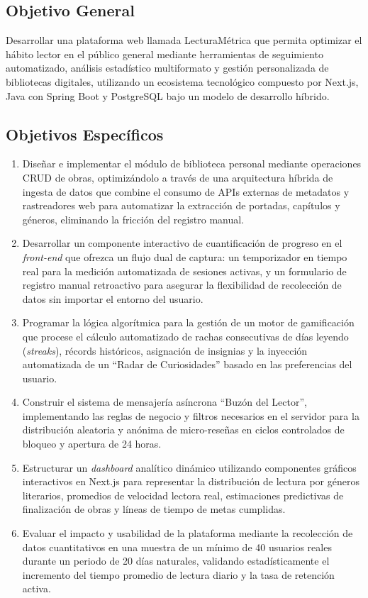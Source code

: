 \documentclass[12pt, atypical, journal]{article}
\begin{document}
\subsection{Objetivo General}
Desarrollar una plataforma web llamada LecturaMétrica que permita optimizar el hábito lector en el público general mediante herramientas de seguimiento automatizado, análisis estadístico multiformato y gestión personalizada de bibliotecas digitales, utilizando un ecosistema tecnológico compuesto por Next.js, Java con Spring Boot y PostgreSQL bajo un modelo de desarrollo híbrido.

\subsection{Objetivos Específicos}
\begin{enumerate}
   \item Diseñar e implementar el módulo de biblioteca personal mediante operaciones CRUD de obras, optimizándolo a través de una arquitectura híbrida de ingesta de datos que combine el consumo de APIs externas de metadatos y rastreadores web para automatizar la extracción de portadas, capítulos y géneros, eliminando la fricción del registro manual.
   \item Desarrollar un componente interactivo de cuantificación de progreso en el \textit{front-end} que ofrezca un flujo dual de captura: un temporizador en tiempo real para la medición automatizada de sesiones activas, y un formulario de registro manual retroactivo para asegurar la flexibilidad de recolección de datos sin importar el entorno del usuario.
   \item Programar la lógica algorítmica para la gestión de un motor de gamificación que procese el cálculo automatizado de rachas consecutivas de días leyendo (\textit{streaks}), récords históricos, asignación de insignias y la inyección automatizada de un ``Radar de Curiosidades'' basado en las preferencias del usuario.
   \item Construir el sistema de mensajería asíncrona ``Buzón del Lector'', implementando las reglas de negocio y filtros necesarios en el servidor para la distribución aleatoria y anónima de micro-reseñas en ciclos controlados de bloqueo y apertura de 24 horas.
   \item Estructurar un \textit{dashboard} analítico dinámico utilizando componentes gráficos interactivos en Next.js para representar la distribución de lectura por géneros literarios, promedios de velocidad lectora real, estimaciones predictivas de finalización de obras y líneas de tiempo de metas cumplidas.
   \item Evaluar el impacto y usabilidad de la plataforma mediante la recolección de datos cuantitativos en una muestra de un mínimo de 40 usuarios reales durante un periodo de 20 días naturales, validando estadísticamente el incremento del tiempo promedio de lectura diario y la tasa de retención activa.
\end{enumerate}
\end{document}
